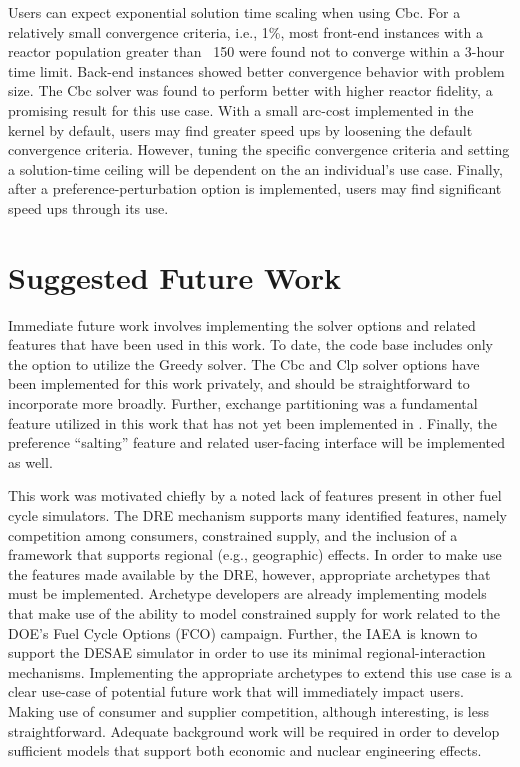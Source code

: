 Users can expect exponential solution time scaling when using Cbc. For a
relatively small convergence criteria, i.e., 1\%, most front-end instances with
a reactor population greater than ~150 were found not to converge within a
3-hour time limit. Back-end instances showed better convergence behavior with
problem size. The Cbc solver was found to perform better with higher reactor
fidelity, a promising result for this use case. With a small arc-cost
implemented in the kernel by default, users may find greater speed ups by
loosening the default convergence criteria. However, tuning the specific
convergence criteria and setting a solution-time ceiling will be dependent on
the an individual's use case. Finally, after a preference-perturbation option is
implemented, users may find significant speed ups through its use.

\section{Suggested Future Work}

Immediate future work involves implementing the solver options and related
features that have been used in this work. To date, the \Cyclus code base
includes only the option to utilize the Greedy solver. The Cbc and Clp solver
options have been implemented for this work privately, and should be
straightforward to incorporate more broadly. Further, exchange partitioning was
a fundamental feature utilized in this work that has not yet been implemented in
\Cyclus. Finally, the preference ``salting'' feature and related user-facing
interface will be implemented as well.

This work was motivated chiefly by a noted lack of features present in other
fuel cycle simulators. The DRE mechanism supports many identified features,
namely competition among consumers, constrained supply, and the inclusion of a
framework that supports regional (e.g., geographic) effects. In order to make
use the features made available by the DRE, however, \Cyclus appropriate
archetypes that must be implemented. Archetype developers are already
implementing models that make use of the ability to model constrained supply for
work related to the DOE's Fuel Cycle Options (FCO) campaign. Further, the IAEA
is known to support the DESAE simulator \cite{} in order to use its minimal
regional-interaction mechanisms. Implementing the appropriate archetypes to
extend this use case is a clear use-case of potential future work that will
immediately impact users. Making use of consumer and supplier competition,
although interesting, is less straightforward. Adequate background work will be
required in order to develop sufficient models that support both economic and
nuclear engineering effects.

